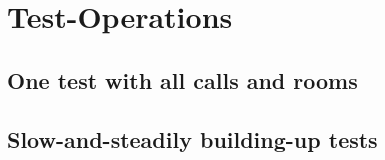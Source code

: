 \section{Test-Operations}
\label{sec:test-operations}

\subsection{One test with all calls and rooms}
\subsection{Slow-and-steadily building-up tests}
